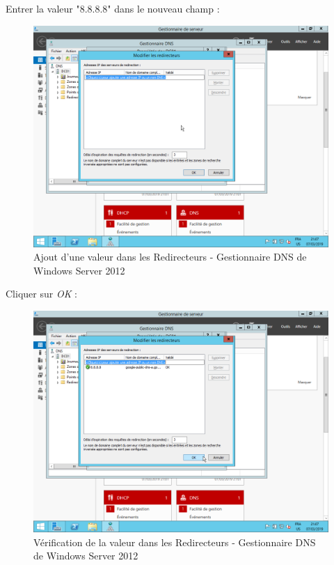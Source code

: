 \newpage
Entrer la valeur "8.8.8.8" dans le nouveau champ :
\begin{figure}[h!]
    \begin{center}
        \includegraphics[scale=0.6]{WS2012_Screenshots/36.png}
        \caption{Ajout d'une valeur dans les Redirecteurs - Gestionnaire DNS de Windows Server 2012}
        \label{WS2012_Screenshots/36}
    \end{center}
\end{figure}
\FloatBarrier

\newpage
Cliquer sur \textit{OK} :
\begin{figure}[h!]
    \begin{center}
        \includegraphics[scale=0.6]{WS2012_Screenshots/37.png}
        \caption{Vérification de la valeur dans les Redirecteurs - Gestionnaire DNS de Windows Server 2012}
        \label{WS2012_Screenshots/37}
    \end{center}
\end{figure}
\FloatBarrier

